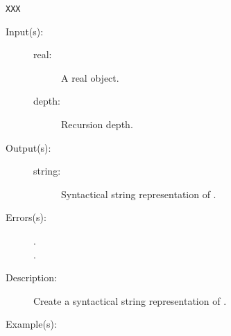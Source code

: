 \begin{description}
\begin{description}
\begin{verbatim}
XXX
		\end{verbatim}
	\end{description}
\label{sprintsdict:realtype}
\item[{\onyxop{real depth}{realtype}{string}}: ]
	\begin{description}\item[]
	\item[Input(s): ]
		\begin{description}\item[]
		\item[real: ]
			A real object.
		\item[depth: ]
			Recursion depth.
		\end{description}
	\item[Output(s): ]
		\begin{description}\item[]
		\item[string: ]
			Syntactical string representation of .
		\end{description}
	\item[Errors(s): ]
		\begin{description}\item[]
		\item[.]
		\item[.]
		\end{description}
	\item[Description: ]
		Create a syntactical string representation of .
	\item[Example(s): ]\begin{verbatim}


\end{verbatim}
\end{description}
\end{description}
